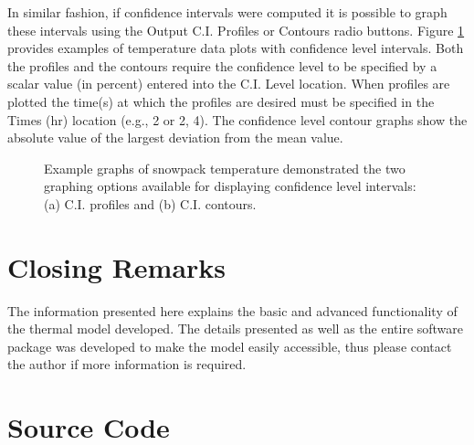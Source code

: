 In similar fashion, if confidence intervals were computed it is possible to graph these intervals using the Output C.I. Profiles or Contours radio buttons.  Figure \ref{TM:fig:ciexample} provides examples of temperature data plots with confidence level intervals.  Both the profiles and the contours require the confidence level to be specified by a scalar value (in percent) entered into the C.I. Level location.  When profiles are plotted the time(s) at which the profiles are desired must be specified in the Times (hr) location (e.g., 2 or 2, 4).  The confidence level contour graphs show the absolute value of the largest deviation from the mean value.

\begin{figure}[ht!]\centering
{}\quad
{}\quad
\caption{Example graphs of snowpack temperature demonstrated the two graphing options available for displaying confidence level intervals: (a) C.I. profiles and (b) C.I. contours.}
\label{TM:fig:ciexample}
\end{figure}

\section{Closing Remarks}
The information presented here explains the basic and advanced functionality of the thermal model developed. The details presented as well as the entire software package was developed to make the model easily accessible, thus please contact the author if more information is required.

\clearpage
\section{Source Code}\label{TM:sec:source}
